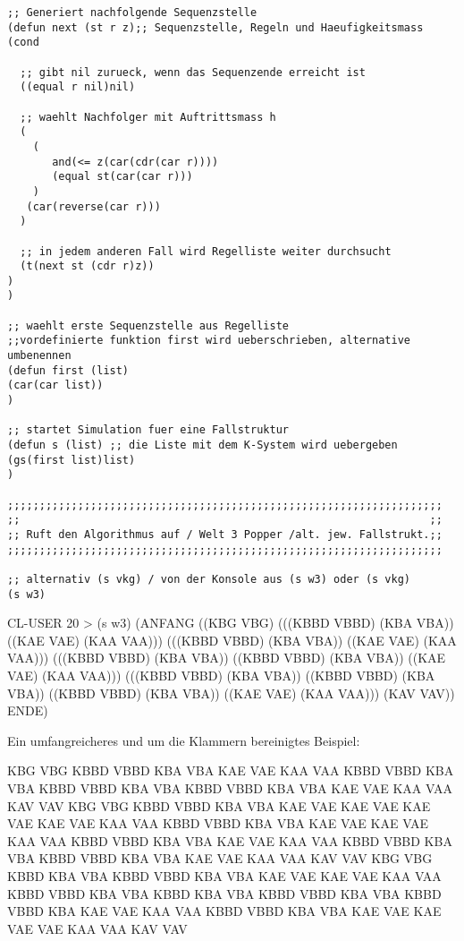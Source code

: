 \documentclass[12pt]{article}
\begin{document}
\begin{verbatim}
;; Generiert nachfolgende Sequenzstelle
(defun next (st r z);; Sequenzstelle, Regeln und Haeufigkeitsmass 
(cond

  ;; gibt nil zurueck, wenn das Sequenzende erreicht ist
  ((equal r nil)nil)

  ;; waehlt Nachfolger mit Auftrittsmass h                                 
  (
    (
       and(<= z(car(cdr(car r))))
       (equal st(car(car r)))
    )
   (car(reverse(car r)))
  )

  ;; in jedem anderen Fall wird Regelliste weiter durchsucht
  (t(next st (cdr r)z))                
)
)

;; waehlt erste Sequenzstelle aus Regelliste
;;vordefinierte funktion first wird ueberschrieben, alternative umbenennen
(defun first (list)
(car(car list))
)

;; startet Simulation fuer eine Fallstruktur
(defun s (list) ;; die Liste mit dem K-System wird uebergeben     
(gs(first list)list)
) 

;;;;;;;;;;;;;;;;;;;;;;;;;;;;;;;;;;;;;;;;;;;;;;;;;;;;;;;;;;;;;;;;;;;;
;;                                                                ;;
;; Ruft den Algorithmus auf / Welt 3 Popper /alt. jew. Fallstrukt.;;
;;;;;;;;;;;;;;;;;;;;;;;;;;;;;;;;;;;;;;;;;;;;;;;;;;;;;;;;;;;;;;;;;;;;

;; alternativ (s vkg) / von der Konsole aus (s w3) oder (s vkg)
(s w3) 
\end{verbatim}

CL-USER 20 > (s w3)
(ANFANG ((KBG VBG) (((KBBD VBBD) (KBA VBA)) ((KAE VAE) (KAA VAA))) (((KBBD VBBD) (KBA VBA)) ((KAE VAE) (KAA VAA))) (((KBBD VBBD) (KBA VBA)) ((KBBD VBBD) (KBA VBA)) ((KAE VAE) (KAA VAA))) (((KBBD VBBD) (KBA VBA)) ((KBBD VBBD) (KBA VBA)) ((KBBD VBBD) (KBA VBA)) ((KAE VAE) (KAA VAA))) (KAV VAV)) ENDE)

Ein umfangreicheres und um die Klammern bereinigtes Beispiel:

KBG VBG 
KBBD VBBD KBA VBA KAE VAE KAA VAA 
KBBD VBBD KBA VBA KBBD VBBD KBA VBA KBBD VBBD KBA VBA KAE VAE 
KAA VAA 
KAV VAV 
KBG VBG 
KBBD VBBD KBA VBA KAE VAE KAE VAE KAE VAE KAE VAE KAA VAA 
KBBD VBBD KBA VBA KAE VAE KAE VAE KAA VAA 
KBBD VBBD KBA VBA KAE VAE KAA VAA 
KBBD VBBD KBA VBA KBBD VBBD KBA VBA KAE VAE KAA VAA 
KAV VAV
KBG VBG
KBBD KBA VBA KBBD VBBD KBA VBA KAE VAE KAE VAE KAA VAA
KBBD VBBD KBA VBA KBBD KBA VBA KBBD VBBD KBA VBA KBBD VBBD KBA 
KAE VAE KAA VAA
KBBD VBBD KBA VBA KAE VAE KAE VAE VAE KAA VAA
KAV VAV

\begin{verbatim}

\end{verbatim}
\end{document}
